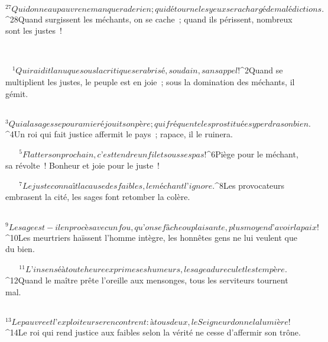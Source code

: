            
         
${}^{27}Qui donne au pauvre ne manquera de rien ;
        qui détourne les yeux sera chargé de malédictions.
        
           
         
${}^{28}Quand surgissent les méchants, on se cache ;
        quand ils périssent, nombreux sont les justes !
        
           
       
      
         
      \bchapter{}
${}^{1}Qui raidit la nuque sous la critique
        sera brisé, soudain, sans appel !
        
           
         
${}^{2}Quand se multiplient les justes, le peuple est en joie ;
        sous la domination des méchants, il gémit.
        
           
         
${}^{3}Qui a la sagesse pour amie réjouit son père ;
        qui fréquente les prostituées y perdra son bien.
        
           
         
${}^{4}Un roi qui fait justice affermit le pays ;
        rapace, il le ruinera.
        
           
         
${}^{5}Flatter son prochain,
        c’est tendre un filet sous ses pas !
        
           
         
${}^{6}Piège pour le méchant, sa révolte !
        Bonheur et joie pour le juste !
        
           
         
${}^{7}Le juste connaît la cause des faibles,
        le méchant l’ignore.
        
           
         
${}^{8}Les provocateurs embrasent la cité,
        les sages font retomber la colère.
        
           
         
${}^{9}Le sage est-il en procès avec un fou,
        qu’on se fâche ou plaisante,
        plus moyen d’avoir la paix !
        
           
         
${}^{10}Les meurtriers haïssent l’homme intègre,
        les honnêtes gens ne lui veulent que du bien.
        
           
         
${}^{11}L’insensé à toute heure exprime ses humeurs,
        le sage a du recul et les tempère.
        
           
         
${}^{12}Quand le maître prête l’oreille aux mensonges,
        tous les serviteurs tournent mal.
        
           
         
${}^{13}Le pauvre et l’exploiteur se rencontrent :
        à tous deux, le Seigneur donne la lumière !
        
           
         
${}^{14}Le roi qui rend justice aux faibles selon la vérité
        ne cesse d’affermir son trône.
        
